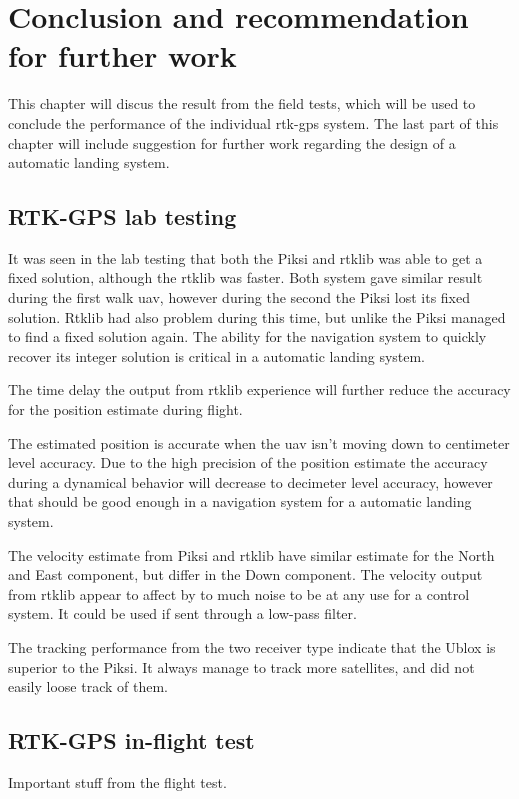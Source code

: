 
\chapter{Conclusion and recommendation for further work}
This chapter will discus the result from the field tests, which will be used to conclude the performance of the individual \gls{rtk-gps} system. The last part of this chapter will include suggestion for further work regarding the design of a automatic landing system.
\section{RTK-GPS lab testing}
It was seen in the lab testing that both the Piksi and \gls{rtklib} was able to get a fixed solution, although the \gls{rtklib} was faster. Both system gave similar result during the first walk \gls{uav}, however during the second the Piksi lost its fixed solution. Rtklib had also problem during this time, but unlike the Piksi managed to find a fixed solution again. The ability for the navigation system to quickly recover its integer solution is critical in a automatic landing system.

The time delay the output from \gls{rtklib} experience will further reduce the accuracy for the position estimate during flight. 

The estimated position is accurate when the \gls{uav} isn't moving down to centimeter level accuracy. Due to the high precision of the position estimate the accuracy during a dynamical behavior will decrease to decimeter level accuracy, however that should be good enough in a navigation system for a automatic landing system.

The velocity estimate from Piksi and \gls{rtklib} have similar estimate for the North and East component, but differ in the Down component. The velocity output from \gls{rtklib} appear to affect by to much noise to be at any use for a control system. It could be used if sent through a low-pass filter.

The tracking performance from the two receiver type indicate that the Ublox is superior to the Piksi. It always manage to track more satellites, and did not easily loose track of them.
\section{RTK-GPS in-flight test}
Important stuff from the flight test.

